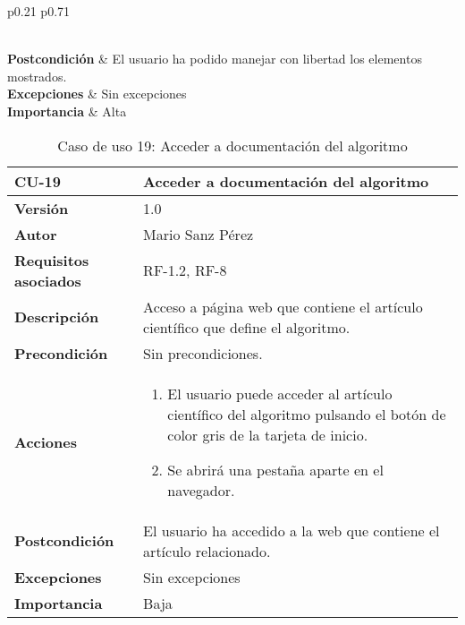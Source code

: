 \begin{table}[p]
\begin{tabularx}{\linewidth}{ p{0.21\columnwidth} p{0.71\columnwidth} }
\begin{enumerate}
		\end{enumerate}\\
		\textbf{Postcondición}        & El usuario ha podido manejar con libertad los elementos mostrados. \\
		\textbf{Excepciones}          & Sin excepciones \\
		\textbf{Importancia}          & Alta \\
		\bottomrule
	\end{tabularx}
	\caption[CU-05: Controlar visualización de grafos]{Caso de uso 5: Controlar visualizaciones (grafos).}
\end{table}


\begin{table}[p]
	\centering
	\begin{tabularx}{\linewidth}{ p{} p{} }
		\toprule
		\textbf{CU-19}    & \textbf{Acceder a documentación del algoritmo}\\
		\toprule
		\textbf{Versión}              & 1.0    \\
		\textbf{Autor}                & Mario Sanz Pérez \\
		\textbf{Requisitos asociados} & RF-1.2, RF-8 \\
		\textbf{Descripción}          & Acceso a página web que contiene el artículo científico que define el algoritmo. \\
		\textbf{Precondición}         & Sin precondiciones. \\
		\textbf{Acciones}             &
		\begin{enumerate}
			\def\labelenumi{\arabic{enumi}.}
			\tightlist
			\item El usuario puede acceder al artículo científico del algoritmo pulsando el botón de color gris de la tarjeta de inicio.
			\item Se abrirá una pestaña aparte en el navegador.
		\end{enumerate}\\
		\textbf{Postcondición}        & El usuario ha accedido a la web que contiene el artículo relacionado. \\
		\textbf{Excepciones}          & Sin excepciones \\
		\textbf{Importancia}          & Baja \\
		\bottomrule
	\end{tabularx}
	\caption[CU-19: Acceder a documentación del algoritmo]{Caso de uso 19: Acceder a documentación del algoritmo}
\end{table}

